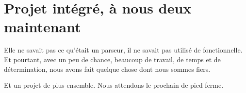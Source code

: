 \documentclass{article}
\begin{document}
\section{Projet intégré, à nous deux maintenant}
	
	Elle ne savait pas ce qu'était un parseur, il ne savait pas utilisé de fonctionnelle. Et pourtant, avec un peu de chance, beaucoup de travail, de temps et de détermination, nous avons fait quelque chose dont nous sommes fiers.
	
	Et un projet de plus ensemble. Nous attendons le prochain de pied ferme.




\end{document}
